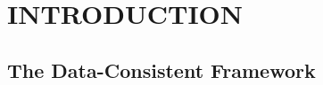\chapter{\uppercase{Introduction}} \label{chapter:01}

%
%


\section{The Data-Consistent Framework}\label{sec:framework}




